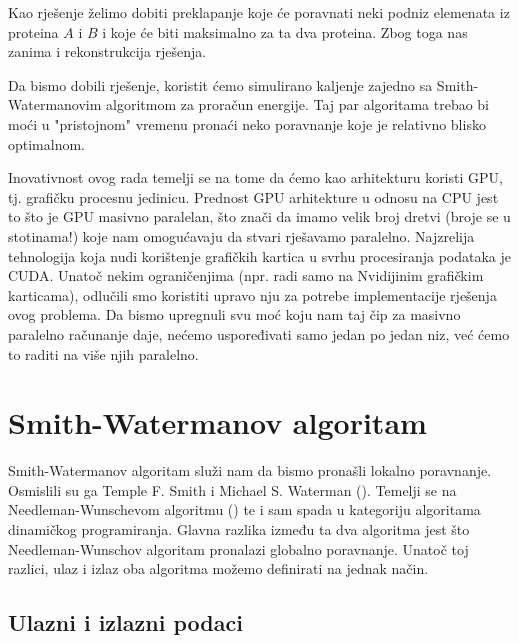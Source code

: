 \documentclass[times, utf8, zavrsni]{fer}
\begin{document}
Kao rješenje želimo dobiti preklapanje koje će poravnati
neki podniz elemenata iz proteina $A$ i $B$ i koje će biti maksimalno
za ta dva proteina. Zbog toga nas zanima i rekonstrukcija rješenja. 

Da bismo dobili rješenje, koristit ćemo simulirano kaljenje 
zajedno sa Smith-Wa{\-}ter{\-}man{\-}ovim algoritmom za proračun energije. 
Taj par algoritama trebao bi moći u "pristojnom" vremenu pronaći
neko poravnanje koje je relativno blisko optimalnom. 

Inovativnost ovog rada temelji se na tome da ćemo kao arhitekturu
koristi GPU, tj. grafičku procesnu jedinicu. Prednost GPU arhitekture
u odnosu na CPU jest to što je GPU masivno paralelan, što znači
da imamo velik broj dretvi (broje se u stotinama!) koje nam omogućavaju
da stvari rješavamo paralelno. Najzrelija tehnologija koja nudi
korištenje grafičkih kartica u svrhu procesiranja podataka je CUDA.
Unatoč nekim ograničenjima (npr. radi samo na Nvidijinim grafičkim
karticama), odlučili smo koristiti upravo nju za potrebe implementacije
rješenja ovog problema. Da bismo upregnuli svu moć koju nam taj
čip za masivno paralelno računanje daje, nećemo uspoređivati samo jedan
po jedan niz, već ćemo to raditi na više njih paralelno.



\chapter{Smith-Watermanov algoritam}
\label{chapter:SWAlg}
Smith-Watermanov algoritam služi nam da bismo pronašli lokalno poravnanje. 
Osmislili su ga Temple F. Smith i Michael S. Waterman (\citealp{smithwaterman1981}).
Temelji se na Needleman-Wunschevom algoritmu (\citealp{needlemanwunsch1970})
te i sam spada u kategoriju algoritama dinamičkog programiranja. Glavna razlika
između ta dva algoritma jest što Needleman-Wunschov algoritam pronalazi globalno
poravnanje. Unatoč toj razlici, ulaz i izlaz oba algoritma možemo 
definirati na jednak način. 

\section{Ulazni i izlazni podaci}
\end{document}
